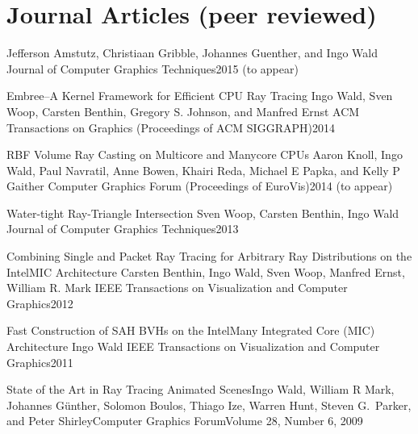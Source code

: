 \documentclass[letterpaper,11pt]{moderncv}
\begin{document}
\section{Journal Articles (peer reviewed)}


{Jefferson Amstutz, Christiaan Gribble, Johannes Guenther, and Ingo Wald}
{Journal of Computer Graphics Techniques}{2015 (to appear)}
  
  \cvbibitem 
    {Embree--A 
 Kernel Framework for Efficient CPU Ray Tracing}
    {Ingo Wald, Sven Woop, Carsten Benthin, Gregory S. Johnson, and Manfred Ernst}
    {ACM Transactions on Graphics (Proceedings of ACM SIGGRAPH)}{2014}

  \cvbibitem 
    {RBF Volume Ray Casting on Multicore and Manycore CPUs}
    {Aaron Knoll, Ingo Wald, Paul Navratil, Anne Bowen, Khairi Reda, Michael E Papka, and Kelly P Gaither}
    {Computer Graphics Forum (Proceedings of EuroVis)}{2014 (to appear)}

  \cvbibitem 
    {Water-tight Ray-Triangle Intersection}
    {Sven Woop, Carsten Benthin, Ingo Wald}
    {Journal of Computer Graphics Techniques}{2013}

  \cvbibitem 
    {Combining Single and Packet Ray Tracing for Arbitrary Ray Distributions on the Intel\textsuperscript\textcopyright MIC Architecture}
    {Carsten Benthin, Ingo Wald, Sven Woop, Manfred Ernst, William R. Mark}
    {IEEE Transactions on Visualization and Computer Graphics}{2012}

  \cvbibitem 
    {Fast Construction of SAH BVHs on the Intel\textsuperscript\textcopyright Many Integrated Core (MIC) Architecture}
    {Ingo Wald}
    {IEEE Transactions on Visualization and Computer Graphics}{2011}


  \cvbibitem 
    {State of the Art in Ray Tracing Animated Scenes}{Ingo Wald,
    William R Mark, Johannes G\"unther, Solomon Boulos, Thiago Ize,
    Warren Hunt, Steven G.\ Parker, and Peter Shirley}{Computer Graphics Forum}{Volume 28, Number 6, 2009}
\end{document}

